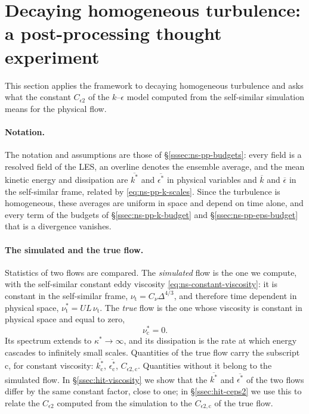 \documentclass{article}
\begin{document}
\section{Decaying homogeneous turbulence: a post-processing thought experiment}\label{sec:hit}
This section applies the framework to decaying homogeneous turbulence and asks
what the constant $C_{\epsilon 2}$ of the $k$--$\epsilon$ model computed from
the self-similar simulation means for the physical flow.

\paragraph{Notation.}
The notation and assumptions are those of \S\ref{sssec:ns-pp-budgets}: every
field is a resolved field of the LES, an overline denotes the ensemble
average, and the mean kinetic energy and dissipation are $\overline{k^*}$ and
$\overline{\epsilon^*}$ in physical variables and $\overline{k}$ and
$\overline{\epsilon}$ in the self-similar frame, related by
\eqref{eq:ns-pp-k-scales}. Since the turbulence is homogeneous, these
averages are uniform in space and depend on time alone, and every term of the
budgets of \S\ref{ssec:ns-pp-k-budget} and \S\ref{ssec:ns-pp-eps-budget} that
is a divergence vanishes.

\paragraph{The simulated and the true flow.}
Statistics of two flows are compared. The \emph{simulated} flow is the one we compute, with the
self-similar constant eddy viscosity \eqref{eq:ns-constant-viscosity}: it is
constant in the self-similar frame, $\nu_{\mathrm{t}} = C_\nu \Delta^{4/3}$,
and therefore time dependent in physical space,
$\nu_{\mathrm{t}}^* = UL\, \nu_{\mathrm{t}}$. The \emph{true} flow is the one
whose viscosity is constant in physical space and equal to zero,
\begin{equation}\label{eq:hit-nu-true}
  \nu_{\mathrm{c}}^* = 0.
\end{equation}
Its spectrum extends to $\kappa^* \to \infty$, and its
dissipation is the rate at which energy cascades to infinitely small scales.
Quantities of the true flow carry the subscript $\mathrm{c}$, for constant
viscosity: $\overline{k_{\mathrm{c}}^*}$, $\overline{\epsilon_{\mathrm{c}}^*}$,
$C_{\epsilon 2,\mathrm{c}}$. Quantities without it belong to the simulated flow.
In \S\ref{ssec:hit-viscosity} we show that the $\overline{k^*}$ and
$\overline{\epsilon^*}$ of the two flows differ by the same constant factor,
close to one; in \S\ref{ssec:hit-ceps2} we use this to relate the
$C_{\epsilon 2}$ computed from the simulation to the $C_{\epsilon 2,\mathrm{c}}$
of the true flow.
\end{document}
